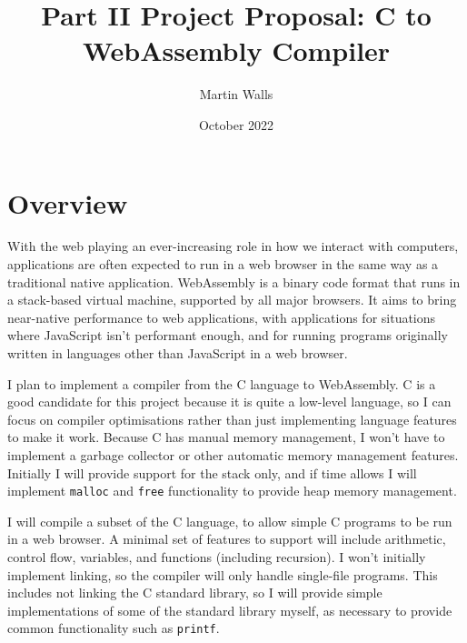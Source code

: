\documentclass[12pt,a4paper]{article}
\title{Part II Project Proposal: C to WebAssembly Compiler}
\author{Martin Walls}
\date{October 2022}
\begin{document}


\setcounter{page}{1}

\maketitle
\thispagestyle{firstpage}

\section*{Overview}

With the web playing an ever-increasing role in how we interact with computers, applications are often expected to run in a web browser in the same way as a traditional native application. WebAssembly is a binary code format that runs in a stack-based virtual machine, supported by all major browsers. It aims to bring near-native performance to web applications, with applications for situations where JavaScript isn't performant enough, and for running programs originally written in languages other than JavaScript in a web browser.

I plan to implement a compiler from the C language to WebAssembly.
C is a good candidate for this project because it is quite a low-level language, so I can focus on compiler optimisations rather than just implementing language features to make it work. Because C has manual memory management, I won't have to implement a garbage collector or other automatic memory management features.
Initially I will provide support for the stack only, and if time allows I will implement \texttt{malloc} and \texttt{free} functionality to provide heap memory management.

I will compile a subset of the C language, to allow simple C programs to be run in a web browser. A minimal set of features to support will include arithmetic, control flow, variables, and functions (including recursion).
I won't initially implement linking, so the compiler will only handle single-file programs. This includes not linking the C standard library, so I will provide simple implementations of some of the standard library myself, as necessary to provide common functionality such as \texttt{printf}.
\end{document}
